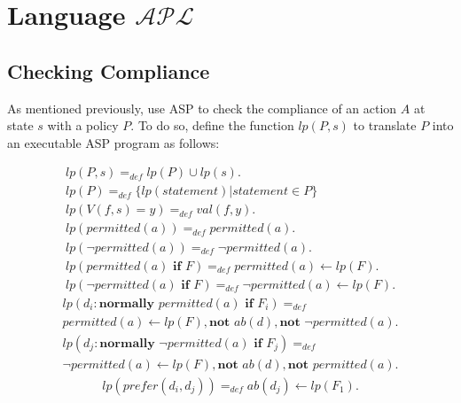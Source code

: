 \chapter{Language $\mathcal{APL}$}

\section{Checking Compliance}

As mentioned previously, \citet{gelfond_authorization_2008} use ASP to check the compliance of an action $A$ at state $s$ with a policy $P$.
To do so, \citet{gelfond_authorization_2008} define the function $lp(P,s)$ to translate $P$ into an executable ASP program as follows:

\begin{gather}
    lp(P,s) =_{def} lp(P)\cup lp(s). \label{eq:apl_lp_01} \\
    lp(P)=_{def}\{lp(statement) | statement \in P\} \label{eq:apl_lp_02} \\
    lp\left(V(f,s)=y\right) =_{def}
        val\left(f,y\right). \label{eq:apl_lp_03} \\
    lp(permitted(a)) =_{def}
        permitted(a). \label{eq:apl_lp_04} \\
    lp(\neg permitted(a)) =_{def}
        \neg permitted(a). \label{eq:apl_lp_05} \\
    lp(permitted(a) \textbf{ if } F) =_{def}
        permitted(a) \leftarrow
            lp(F). \label{eq:apl_lp_06} \\
    lp(\neg permitted(a) \textbf{ if } F) =_{def}
        \neg permitted(a) \leftarrow
            lp(F). \label{eq:apl_lp_07}
\end{gather}
\begin{multline}
    \label{eq:apl_lp_08}
    lp(d_i: \textbf{normally } permitted(a) \textbf{ if } F_i) =_{def} \\
        permitted(a) \leftarrow
            lp(F),
            \textbf{not } ab(d),
            \textbf{not } \neg permitted(a).
\end{multline}
\begin{multline}
    \label{eq:apl_lp_09}
    lp(d_j: \textbf{normally } \neg permitted(a) \textbf{ if } F_j) =_{def} \\
        \neg permitted(a) \leftarrow
        lp(F),
        \textbf{not } ab(d),
        \textbf{not } permitted(a).
\end{multline}
\begin{gather}
    lp(prefer(d_i, d_j)) =_{def}
        ab(d_j) \leftarrow lp(F_1). \label{eq:apl_lp_10}
\end{gather}

